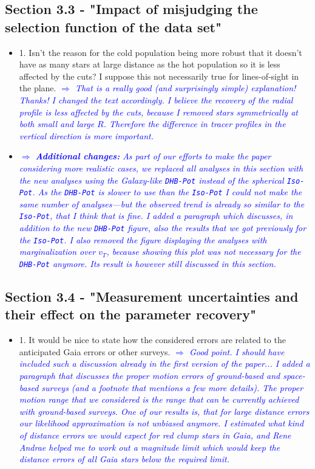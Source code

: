 \documentclass[10pt,a4paper]{article}
\newcommand{\Comment}[1]{\textsl{\textcolor{Blue}{$\Longrightarrow$ {#1}}}}
\begin{document}
\subsection{Section 3.3 - "Impact of misjudging the selection function of the data set"}
\begin{itemize}
\item 1. Isn't the reason for the cold population being more robust that it doesn't have as many stars at large distance as the hot population so it is less affected by the cuts? I suppose this not necessarily true for lines-of-sight in the plane. \Comment{That is a really good (and surprisingly simple) explanation! Thanks! I changed the text accordingly. I believe the recovery of the radial profile is less affected by the cuts, because I removed stars symmetrically at both small and large $R$. Therefore the difference in tracer profiles in the vertical direction is more important.}
\item \Comment{\textbf{Additional changes:} As part of our efforts to make the paper considering more realistic cases, we replaced all analyses in this section with the new analyses using the Galaxy-like \texttt{DHB-Pot} instead of the spherical \texttt{Iso-Pot}. As the \texttt{DHB-Pot} is slower to use than the \texttt{Iso-Pot} I could not make the same number of analyses---but the observed trend is already so similar to the \texttt{Iso-Pot}, that I think that is fine. I added a paragraph which discusses, in addition to the new \texttt{DHB-Pot} figure, also the results that we got previously for the \texttt{Iso-Pot}. I also removed the figure displaying the analyses with marginalization over $v_T$, because showing this plot was not necessary for the \texttt{DHB-Pot} anymore. Its result is however still discussed in this section.}
\end{itemize}

\subsection{Section 3.4 - "Measurement uncertainties and their effect on the parameter recovery"}
\begin{itemize}
\item 1. It would be nice to state how the considered errors are related to the anticipated Gaia errors or other surveys. \Comment{Good point. I should have included such a discussion already in the first version of the paper... I added a paragraph that discusses the proper motion errors of ground-based and space-based surveys (and a footnote that mentions a few more details). The proper motion range that we considered is the range that can be currently achieved with ground-based surveys. One of our results is, that for large distance errors our likelihood approximation is not unbiased anymore. I estimated what kind of distance errors we would expect for red clump stars in Gaia, and Rene Andrae helped me to work out a magnitude limit which would keep the distance errors of all Gaia stars below the required limit.}
\end{itemize}
\end{document}
